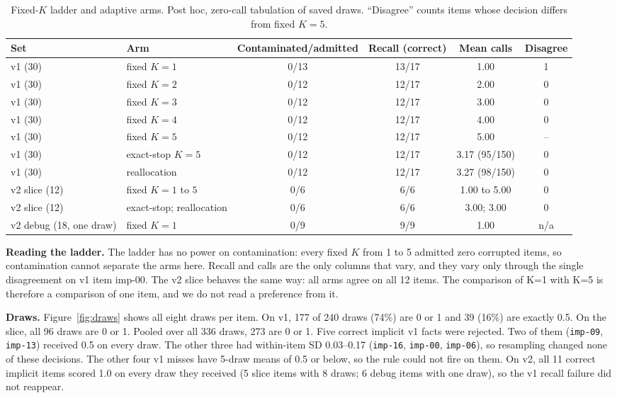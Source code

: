 \documentclass[11pt]{article}
\begin{document}
\begin{table}[t]
\centering
\caption{Fixed-$K$ ladder and adaptive arms. Post hoc, zero-call tabulation of saved draws. ``Disagree'' counts items whose decision differs from fixed $K{=}5$.}
\label{tab:ladder}
\small
\setlength{\tabcolsep}{3pt}
\begin{tabular}{llcccc}
\toprule
Set & Arm & Contaminated/admitted & Recall (correct) & Mean calls & Disagree \\
\midrule
v1 (30) & fixed $K{=}1$ & 0/13 & 13/17 & 1.00 & 1 \\
v1 (30) & fixed $K{=}2$ & 0/12 & 12/17 & 2.00 & 0 \\
v1 (30) & fixed $K{=}3$ & 0/12 & 12/17 & 3.00 & 0 \\
v1 (30) & fixed $K{=}4$ & 0/12 & 12/17 & 4.00 & 0 \\
v1 (30) & fixed $K{=}5$ & 0/12 & 12/17 & 5.00 & -- \\
v1 (30) & exact-stop $K{=}5$ & 0/12 & 12/17 & 3.17 (95/150) & 0 \\
v1 (30) & reallocation & 0/12 & 12/17 & 3.27 (98/150) & 0 \\
v2 slice (12) & fixed $K{=}1$ to $5$ & 0/6 & 6/6 & 1.00 to 5.00 & 0 \\
v2 slice (12) & exact-stop; reallocation & 0/6 & 6/6 & 3.00; 3.00 & 0 \\
v2 debug (18, one draw) & fixed $K{=}1$ & 0/9 & 9/9 & 1.00 & n/a \\
\bottomrule
\end{tabular}
\end{table}

\textbf{Reading the ladder.} The ladder has no power on contamination: every fixed $K$ from 1 to 5 admitted zero corrupted items, so contamination cannot separate the arms here. Recall and calls are the only columns that vary, and they vary only through the single disagreement on v1 item imp-00. The v2 slice behaves the same way: all arms agree on all 12 items. The comparison of K=1 with K=5 is therefore a comparison of one item, and we do not read a preference from it.

\textbf{Draws.} Figure~\ref{fig:draws} shows all eight draws per item. On v1, 177 of 240 draws (74\%) are 0 or 1 and 39 (16\%) are exactly 0.5. On the slice, all 96 draws are 0 or 1. Pooled over all 336 draws, 273 are 0 or 1. Five correct implicit v1 facts were rejected. Two of them (\texttt{imp-09}, \texttt{imp-13}) received 0.5 on every draw. The other three had within-item SD 0.03--0.17 (\texttt{imp-16}, \texttt{imp-00}, \texttt{imp-06}), so resampling changed none of these decisions. The other four v1 misses have 5-draw means of 0.5 or below, so the rule could not fire on them. On v2, all 11 correct implicit items scored 1.0 on every draw they received (5 slice items with 8 draws; 6 debug items with one draw), so the v1 recall failure did not reappear.
\end{document}
